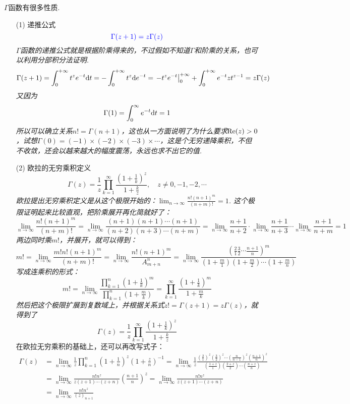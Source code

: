 \documentclass[main.tex]{subfiles}
\begin{document}
\(\Gamma\)函数有很多性质.
\begin{itemize}

    \item [(1)] 递推公式
    \[ {\color{blue} \Gamma(z+1) = z\Gamma(z)} \]
    \textit{
        \(\Gamma\)函数的递推公式就是根据阶乘得来的，不过假如不知道\(\Gamma\)和阶乘的关系，也可以利用分部积分法证明.
        \[ \Gamma(z+1) = \int_0^{+\infty} t^{z} e^{-t} {\rm d}t = -\int_{0}^{+\infty}t^z {\rm d}e^{-t} = \left.-t^ze^{-t}\right|_0^{+\infty}+\int_{0}^{+\infty}e^{-t}zt^{z-1} = z\Gamma(z)\]
        又因为
        \[ \Gamma(1) = \int_{0}^{\infty} e^{-t}{\rm d}t = 1\]
        所以可以确立关系\(n! = \Gamma(n+1)\)，这也从一方面说明了为什么要求\({\rm Re}(z)>0\)，试想\(\Gamma(0) = (-1)\times(-2)\times(-3)\times\cdots\)，这是个无穷递降乘积，不但不收敛，还会以越来越大的幅度震荡，永远也求不出它的值.
    }

    \item[(2)] 欧拉的无穷乘积定义
    \[\Gamma(z) = \frac{1}{z}\prod_{k=1}^{\infty} \frac{(1+\frac{1}{k})^z}{1+\frac{k}{z}}, \quad z \neq 0, -1, -2, \cdots\]
    \textit{
        欧拉提出无穷乘积定义是从这个极限开始的：\(\displaystyle{\lim_{n \to \infty} \frac{n!(n+1)^m}{(n+m)!}}=1\). 这个极限证明起来比较直观，把阶乘展开再化简就好了：
        \[\lim_{n \to \infty} \frac{n!(n+1)^m}{(n+m)!} = \lim_{n \to \infty} \frac{(n+1)(n+1) \cdots (n+1)}{(n+2)(n+3)\cdots(n+m)} = \lim_{n \to \infty} \frac{n+1}{n+2} \cdot \lim_{n \to \infty} \frac{n+1}{n+3} \cdots \lim_{n \to \infty} \frac{n+1}{n+m} = 1\]
        两边同时乘\(m!\)，并展开，就可以得到：
        \[m! = \lim_{n \to \infty} \frac{m!n!(n+1)^m}{(n+m)!} = \lim_{n \to \infty} \frac{n!(n+1)^m}{A_{m+n}^n} = \lim_{n \to \infty} \frac{\left( \frac{2}{1}\frac{3}{2}\cdots\frac{n+1}{n}\right)^m}{(1+\frac{m}{1})(1+\frac{m}{2})\cdots(1+\frac{m}{n})}\]
        写成连乘积的形式：
        \[ m! = \lim_{n \to \infty} \frac{\prod_{k=1}^{n}\left(1+\frac{1}{k}\right)^m}{\prod_{k=1}^{n}(1+\frac{m}{k})} = \prod_{k=1}^{\infty}\frac{(1+\frac{1}{k})^m}{1+\frac{m}{k}}\]
        然后把这个极限扩展到复数域上，并根据关系式\(z!=\Gamma(z+1) = z\Gamma(z)\)，就得到了
        \[\Gamma(z) = \frac{1}{z}\prod_{k=1}^{\infty} \frac{(1+\frac{1}{k})^z}{1+\frac{k}{z}}\]
    }
    在欧拉无穷乘积的基础上，还可以再改写式子：
    \begin{align*}
        \Gamma(z) &= \lim_{n \to \infty}\frac{1}{z}\prod_{k=1}^{n}\left(1+\frac{1}{n}\right)^z\left(1+\frac{z}{n}\right)^{-1} = \lim_{n \to \infty} \frac{1}{z} \frac{(\frac{2}{1})^z(\frac{3}{2})^z\cdots(\frac{n}{n-1})^z(\frac{n+1}{n})^z}{(\frac{1+z}{1})(\frac{2+z}{2})\cdots(\frac{n+z}{n})} \\
        &= \lim_{n \to \infty}\frac{n!n^z}{z(z+1)\cdots(z+n)}\left(\frac{n+1}{n}\right)^z = \lim_{n \to \infty} \frac{n!n^z}{z(z+1)\cdots(z+n)} \\
        &= \lim_{n \to \infty} \frac{n!n^z}{(z)_{n+1}}
    \end{align*}
     

\end{itemize}
\end{document}
